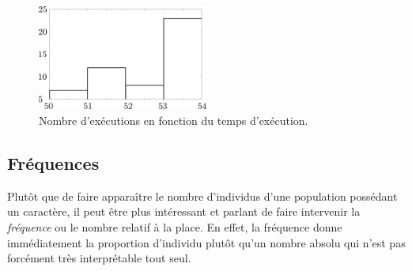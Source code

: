 \documentclass[a4paper,12pt]{book}
\begin{document}
\begin{figure}[htp]
\begin{center}
\includegraphics[width=0.5\textwidth]{figs/graph_exec.pdf}
\caption{Nombre d'exécutions en fonction du temps d'exécution.}\label{fig_exec}
\end{center}
\end{figure}

\subsection{Fréquences}

Plutôt que de faire apparaître le nombre d'individus d'une population 
possédant un caractère, il peut être plus intéressant et parlant de faire intervenir 
la \textit{fréquence} ou le nombre relatif à la place. En effet, la fréquence donne 
immédiatement la proportion d'individu plutôt qu'un nombre absolu qui n'est pas forcément 
très interprétable tout seul. 
\end{document}
